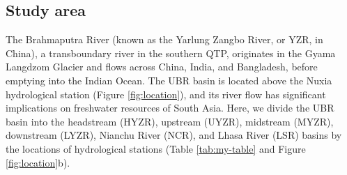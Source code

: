 \documentclass[hess, manuscript]{copernicus}
\begin{document}
\subsection{Study area}
The Brahmaputra River (known as the Yarlung Zangbo River, or YZR, in China), a transboundary river in the southern QTP, originates in the Gyama Langdzom Glacier and flows across China, India, and Bangladesh, before emptying into the Indian Ocean. The UBR basin is located above the Nuxia hydrological station (Figure \ref{fig:location}), and its river flow has significant implications on freshwater resources of South Asia. 
Here, we divide the UBR basin into the headstream (HYZR), upstream (UYZR), midstream (MYZR), downstream (LYZR), Nianchu River (NCR), and Lhasa River (LSR) basins by the locations of hydrological stations (Table \ref{tab:my-table} and Figure \ref{fig:location}b).
\end{document}
